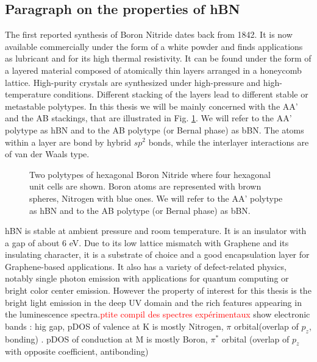 \subsection{Paragraph on the properties of hBN}
The first reported synthesis of Boron Nitride dates back from 1842.\cite{balmain1842xlvi} It is now available commercially under the form of a white powder and finds applications as lubricant and for its high thermal resistivity. It can be found under the form of a layered material composed of atomically thin layers arranged in a honeycomb lattice. High-purity crystals are synthesized under high-pressure and high-temperature conditions.\cite{watanabe2004direct} 
Different stacking of the layers lead to different stable or metastable polytypes. In this thesis we will be mainly concerned with the AA' and the AB stackings, that are illustrated in Fig. \ref{fig:hBN_stackings}. We will refer to the AA' polytype as hBN and to the AB polytype (or Bernal phase) as bBN. The atoms within a layer are bond by hybrid $sp^2$ bonds, while the interlayer interactions are of van der Waals type.
\begin{figure}[h!b]%
	\vspace{0.2cm}
	\setcapindent{2em}
	\centering
     \qquad
    \caption{Two polytypes of hexagonal Boron Nitride where four hexagonal unit cells are shown. Boron atoms are represented with brown spheres, Nitrogen with blue ones. We will refer to the AA' polytype as hBN and to the AB polytype (or Bernal phase) as bBN.}
	\label{fig:hBN_stackings}
\end{figure}
%
hBN is stable at ambient pressure and room temperature. It is an insulator with a gap of about 6 eV. Due to its low lattice mismatch with Graphene and its insulating character, it is a substrate of choice and a good encapsulation layer for Graphene-based applications.\cite{somethg} It also has a variety of defect-related physics, notably single photon emission with applications for quantum computing\cite{QC} or bright color center emission. However the property of interest for this thesis is the bright light emission in the deep UV domain and the rich features appearing in the luminescence spectra.\textcolor{red}{ptite compil des spectres expérimentaux}
%
show electronic bands : hig gap, pDOS of valence at K is mostly Nitrogen, $\pi$ orbital(overlap of $p_z$, bonding)  . pDOS of conduction at M is mostly Boron, $\pi^*$ orbital (overlap of $p_z$ with opposite coefficient, antibonding)\\

